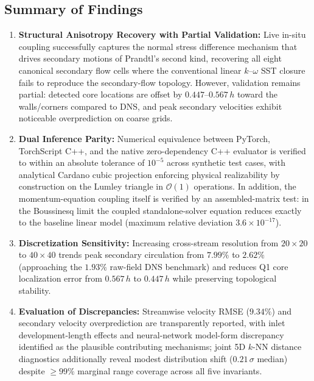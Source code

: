 \documentclass[11pt,a4paper]{article}
\begin{document}
\subsection{Summary of Findings}
\begin{enumerate}
    \item \textbf{Structural Anisotropy Recovery with Partial Validation:} Live in-situ coupling successfully captures the normal stress difference mechanism that drives secondary motions of Prandtl's second kind, recovering all eight canonical secondary flow cells where the conventional linear $k\text{--}\omega$ SST closure fails to reproduce the secondary-flow topology. However, validation remains partial: detected core locations are offset by $0.447\text{--}0.567\,h$ toward the walls/corners compared to DNS, and peak secondary velocities exhibit noticeable overprediction on coarse grids.
    \item \textbf{Dual Inference Parity:} Numerical equivalence between PyTorch, TorchScript C++, and the native zero-dependency C++ evaluator is verified to within an absolute tolerance of $10^{-5}$ across synthetic test cases, with analytical Cardano cubic projection enforcing physical realizability by construction on the Lumley triangle in $\mathcal{O}(1)$ operations. In addition, the momentum-equation coupling itself is verified by an assembled-matrix test: in the Boussinesq limit the coupled standalone-solver equation reduces exactly to the baseline linear model (maximum relative deviation $3.6 \times 10^{-17}$).
    \item \textbf{Discretization Sensitivity:} Increasing cross-stream resolution from $20 \times 20$ to $40 \times 40$ trends peak secondary circulation from $7.99\%$ to $2.62\%$ (approaching the $1.93\%$ raw-field DNS benchmark) and reduces Q1 core localization error from $0.567\,h$ to $0.447\,h$ while preserving topological stability.
    \item \textbf{Evaluation of Discrepancies:} Streamwise velocity RMSE ($9.34\%$) and secondary velocity overprediction are transparently reported, with inlet development-length effects and neural-network model-form discrepancy identified as the plausible contributing mechanisms; joint 5D $k$-NN distance diagnostics additionally reveal modest distribution shift ($0.21\,\sigma$ median) despite $\ge 99\%$ marginal range coverage across all five invariants.
\end{enumerate}
\end{document}

